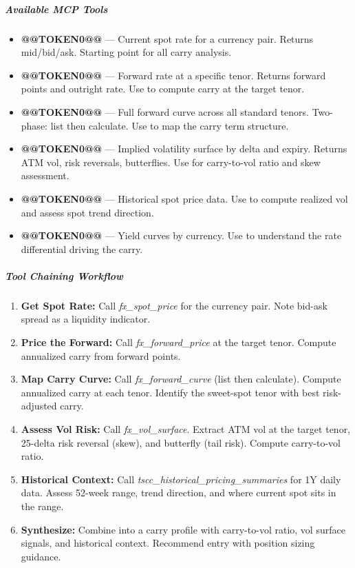 \documentclass[11pt]{article}
\begin{document}
\subparagraph{Available MCP Tools}\mbox{}\par

\begin{itemize}[leftmargin=*,itemsep=2pt,topsep=2pt]
\item {} \textbf{@@TOKEN0@@} — Current spot rate for a currency pair. Returns mid/bid/ask. Starting point for all carry analysis.
\item {} \textbf{@@TOKEN0@@} — Forward rate at a specific tenor. Returns forward points and outright rate. Use to compute carry at the target tenor.
\item {} \textbf{@@TOKEN0@@} — Full forward curve across all standard tenors. Two-phase: list then calculate. Use to map the carry term structure.
\item {} \textbf{@@TOKEN0@@} — Implied volatility surface by delta and expiry. Returns ATM vol, risk reversals, butterflies. Use for carry-to-vol ratio and skew assessment.
\item {} \textbf{@@TOKEN0@@} — Historical spot price data. Use to compute realized vol and assess spot trend direction.
\item {} \textbf{@@TOKEN0@@} — Yield curves by currency. Use to understand the rate differential driving the carry.
\end{itemize}

\subparagraph{Tool Chaining Workflow}\mbox{}\par

\begin{enumerate}[leftmargin=*,itemsep=2pt,topsep=2pt]
\item {} \textbf{Get Spot Rate:} Call \emph{fx\_\allowbreak{}spot\_\allowbreak{}price} for the currency pair. Note bid-ask spread as a liquidity indicator.
\item {} \textbf{Price the Forward:} Call \emph{fx\_\allowbreak{}forward\_\allowbreak{}price} at the target tenor. Compute annualized carry from forward points.
\item {} \textbf{Map Carry Curve:} Call \emph{fx\_\allowbreak{}forward\_\allowbreak{}curve} (list then calculate). Compute annualized carry at each tenor. Identify the sweet-spot tenor with best risk-adjusted carry.
\item {} \textbf{Assess Vol Risk:} Call \emph{fx\_\allowbreak{}vol\_\allowbreak{}surface}. Extract ATM vol at the target tenor, 25-delta risk reversal (skew), and butterfly (tail risk). Compute carry-to-vol ratio.
\item {} \textbf{Historical Context:} Call \emph{tscc\_\allowbreak{}historical\_\allowbreak{}pricing\_\allowbreak{}summaries} for 1Y daily data. Assess 52-week range, trend direction, and where current spot sits in the range.
\item {} \textbf{Synthesize:} Combine into a carry profile with carry-to-vol ratio, vol surface signals, and historical context. Recommend entry with position sizing guidance.
\end{enumerate}
\end{document}

